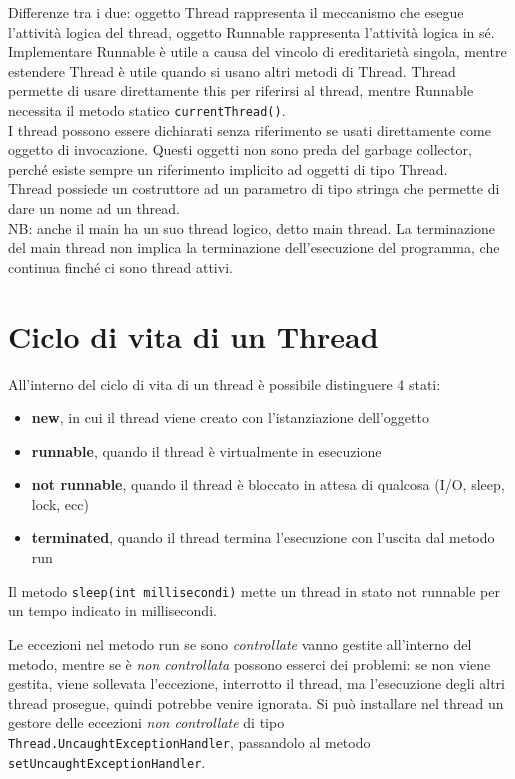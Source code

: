 Differenze tra i due: oggetto Thread rappresenta il meccanismo che esegue l'attività logica del thread, oggetto Runnable rappresenta l'attività logica in sé.
Implementare Runnable è utile a causa del vincolo di ereditarietà singola, mentre estendere Thread è utile quando si usano altri metodi di Thread.
Thread permette di usare direttamente this per riferirsi al thread, mentre Runnable necessita il metodo statico \texttt{currentThread()}. \\
I thread possono essere dichiarati senza riferimento se usati direttamente come oggetto di invocazione. Questi oggetti non sono preda del garbage collector, perché esiste sempre un riferimento implicito ad oggetti di tipo Thread. \\
Thread possiede un costruttore ad un parametro di tipo stringa che permette di dare un nome ad un thread. \\
NB: anche il main ha un suo thread logico, detto main thread. La terminazione del main thread non implica la terminazione dell'esecuzione del programma, che continua finché ci sono thread attivi.


\section{Ciclo di vita di un Thread}
All'interno del ciclo di vita di un thread è possibile distinguere 4 stati:
\begin{itemize}
\item \textbf{new}, in cui il thread viene creato con l'istanziazione dell'oggetto
\item \textbf{runnable}, quando il thread è virtualmente in esecuzione
\item \textbf{not runnable}, quando il thread è bloccato in attesa di qualcosa (I/O, sleep, lock, ecc)
\item \textbf{terminated}, quando il thread termina l'esecuzione con l'uscita dal metodo run
\end{itemize}

Il metodo \texttt{sleep(int millisecondi)} mette un thread in stato not runnable per un tempo indicato in millisecondi.

Le eccezioni nel metodo run se sono \textit{controllate} vanno gestite all'interno del metodo, mentre se è \textit{non controllata} possono esserci dei problemi: se non viene gestita, viene sollevata l'eccezione, interrotto il thread, ma l'esecuzione degli altri thread prosegue, quindi potrebbe venire ignorata. Si può installare nel thread un gestore delle eccezioni \textit{non controllate} di tipo \texttt{Thread.UncaughtExceptionHandler}, passandolo al metodo \texttt{setUncaughtExceptionHandler}.

